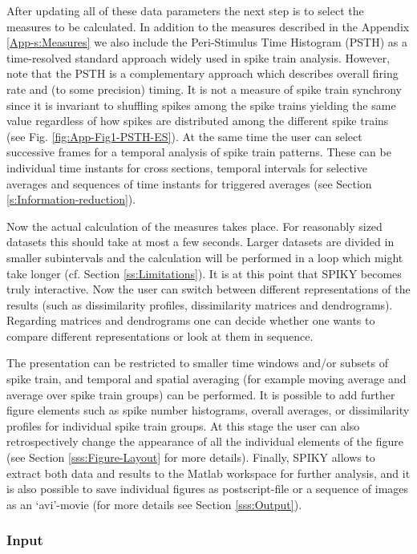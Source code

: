 \documentclass[10pt,twocolumn]{elsart5p}
\begin{document}
After updating all of these data parameters the next step is to select the measures to be calculated. In addition to the measures described in the Appendix \ref{App-s:Measures} we also include the Peri-Stimulus Time Histogram (PSTH) as a time-resolved standard approach widely used in spike train analysis. However, note that the PSTH is a complementary approach which describes overall firing rate and (to some precision) timing. It is not a measure of spike train synchrony \citep{Kreuz11} since it is invariant to shuffling spikes among the spike trains yielding the same value regardless of how spikes are distributed among the different spike trains (see Fig. \ref{fig:App-Fig1-PSTH-ES}). At the same time the user can select successive frames for a temporal analysis of spike train patterns. These can be individual time instants for cross sections, temporal intervals for selective averages and sequences of time instants for triggered averages (see Section \ref{s:Information-reduction}).

Now the actual calculation of the measures takes place. For reasonably sized datasets this should take at most a few seconds. Larger datasets are divided in smaller subintervals and the calculation will be performed in a loop which might take longer (cf. Section \ref{ss:Limitations}). It is at this point that SPIKY becomes truly interactive. Now the user can switch between different representations of the results (such as dissimilarity profiles, dissimilarity matrices and dendrograms). Regarding matrices and dendrograms one can decide whether one wants to compare different representations or look at them in sequence.

The presentation can be restricted to smaller time windows and/or subsets of spike train, and temporal and spatial averaging (for example moving average and average over spike train groups) can be performed. It is possible to add further figure elements such as spike number histograms, overall averages, or dissimilarity profiles for individual spike train groups. At this stage the user can also retrospectively change the appearance of all the individual elements of the figure (see Section \ref{sss:Figure-Layout} for more details). Finally, SPIKY allows to extract both data and results to the Matlab workspace for further analysis, and it is also possible to save individual figures as postscript-file or a sequence of images as an `avi'-movie (for more details see Section \ref{sss:Output}).


\subsubsection{\label{sss:Input} Input}
\end{document}
